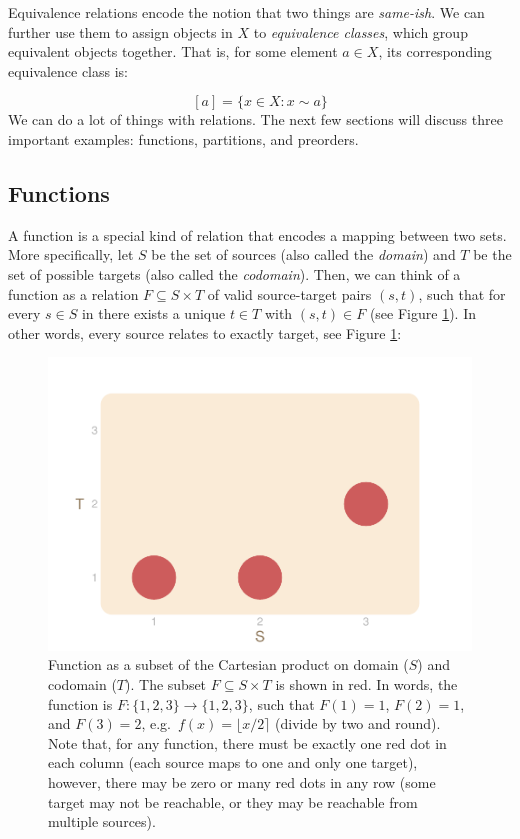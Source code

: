 \documentclass[
]{book}
\theoremstyle{definition}
\theoremstyle{definition}
\theoremstyle{definition}
\theoremstyle{definition}
\theoremstyle{remark}
\begin{document}
Equivalence relations encode the notion that two things are \emph{same-ish}. We can further use them to assign objects in \(X\) to \emph{equivalence classes}, which group equivalent objects together. That is, for some element \(a \in X\), its corresponding equivalence class is:

\[[a] = \{ x \in X : x \sim a \}\]
We can do a lot of things with relations. The next few sections will discuss three important examples: functions, partitions, and preorders.

\hypertarget{functions}{%
\subsection{Functions}\label{functions}}

A function is a special kind of relation that encodes a mapping between two sets. More specifically, let \(S\) be the set of sources (also called the \emph{domain}) and \(T\) be the set of possible targets (also called the \emph{codomain}). Then, we can think of a function as a relation \(F \subseteq S \times T\) of valid source-target pairs \((s, t)\), such that for every \(s \in S\) in there exists a unique \(t \in T\) with \((s, t) \in F\) (see Figure \ref{fig:function-subset}). In other words, every source relates to exactly target, see Figure \ref{fig:function-subset}:

\begin{figure}
\centering
\includegraphics{_main_files/figure-latex/function-subset-1.pdf}
\caption{\label{fig:function-subset}Function as a subset of the Cartesian product on domain (\(S\)) and codomain (\(T\)). The subset \(F \subseteq S \times T\) is shown in red. In words, the function is \(F: \{ 1, 2, 3 \} \to \{ 1, 2, 3 \}\), such that \(F(1) = 1\), \(F(2) = 1\), and \(F(3) = 2\), e.g.~\(f(x) = \lfloor x / 2 \rceil\) (divide by two and round). Note that, for any function, there must be exactly one red dot in each column (each source maps to one and only one target), however, there may be zero or many red dots in any row (some target may not be reachable, or they may be reachable from multiple sources).}
\end{figure}
\end{document}

